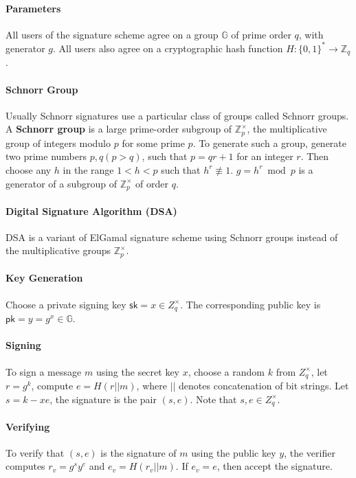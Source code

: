 \paragraph{Parameters} All users of the signature scheme agree on a group $\mathbb{G}$ of prime order $q$, with generator $g$. All users also agree on a cryptographic hash function $H:\{0,1\}^*\to \mathbb{Z}_q$. 

\paragraph{Schnorr Group} Usually Schnorr signatures use a particular class of groups called Schnorr groups. A \textbf{Schnorr group} is a large prime-order subgroup of $\mathbb{Z}_p^{\times}$, the multiplicative group of integers modulo $p$ for some prime $p$. To generate such a group, generate two prime numbers $p, q (p>q)$, such that $p=qr+1$ for an integer $r$. Then choose any $h$ in the range $1<h<p$ such that $h^r\not\equiv 1$. $g=h^r\bmod p$ is a generator of a subgroup of $\mathbb{Z}_p^\times$ of order $q$. 

\paragraph{Digital Signature Algorithm (DSA)} DSA is a variant of ElGamal signature scheme using Schnorr groups instead of the multiplicative groups $\mathbb{Z}_p^\times$. 

\paragraph{Key Generation} Choose a private signing key $\mathsf{sk}=x\in Z_q^\times$. The corresponding public key is $\mathsf{pk}=y=g^x \in \mathbb{G}$. 

\paragraph{Signing} To sign a message $m$ using the secret key $x$, choose a random $k$ from $Z_q^\times$, let $r=g^k$, compute $e=H(r||m)$, where $||$ denotes concatenation of bit strings. Let $s=k-xe$, the signature is the pair $(s,e)$. Note that $s, e\in Z_q^\times$. 

\paragraph{Verifying} To verify that $(s,e)$ is the signature of $m$ using the public key $y$, the verifier computes $r_v = g^s y^e$ and $e_v = H(r_v||m)$. If $e_v=e$, then accept the signature. 


